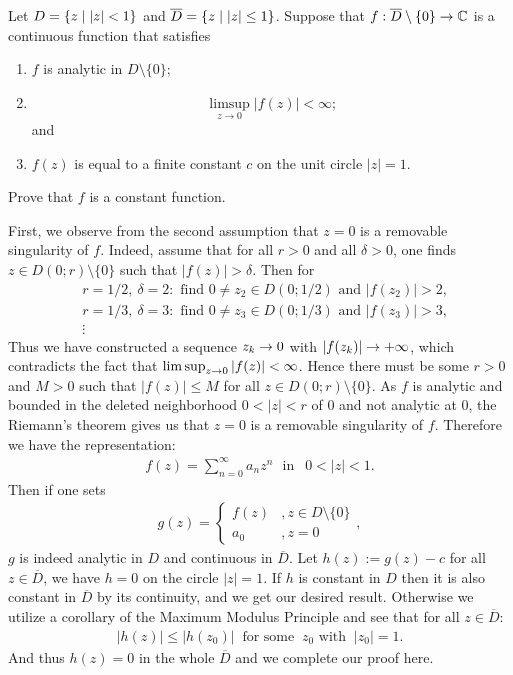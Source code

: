 \begin{problem}
Let $D = \left\{ z \mid |z| < 1\right\}$ and $\overline{D} = \left\{ z \mid |z| \leq 1\right\}$. Suppose that $f: \overline{D} \setminus \{0\} \to \mathbb{C}$ is a continuous function that satisfies
\begin{enumerate}
    \item $f$ is analytic in $D \setminus \{0\}$;
    \item $$ \limsup_{z \to 0} |f(z)| < \infty; $$ and
    \item $f(z)$ is equal to a finite constant $c$ on the unit circle $|z| = 1$.
\end{enumerate}
Prove that $f$ is a constant function.
\begin{solution}
First, we observe from the second assumption that $z=0$ is a removable singularity of $f$. Indeed, assume that for all $r>0$ and all $\delta >0$, one finds $z \in D(0;r)\setminus \{0\}$ such that $|f(z)|> \delta$. Then for \begin{align*}
    &r=1/2,\ \delta =2: \text{ find } 0\neq z_2 \in D(0;1/2) \text{ and } |f(z_2)|>2, \\
    &r=1/3,\ \delta =3: \text{ find } 0\neq z_3 \in D(0;1/3) \text{ and } |f(z_3)|>3, \\
    &\vdots
\end{align*}
Thus we have constructed a sequence $z_k \rightarrow 0$ with $|f(z_k)| \rightarrow +\infty$, which contradicts the fact that $\limsup_{z\rightarrow 0} |f(z)| < \infty$. Hence there must be some $r>0$ and $M>0$ such that $|f(z)| \le M$ for all $z\in D(0;r)\setminus \{0\}$. As $f$ is analytic and bounded in the deleted neighborhood $0<|z|<r$ of $0$ and not analytic at $0$, the Riemann's theorem gives us that $z=0$ is a removable singularity of $f$. Therefore we have the representation:
\begin{align*}
    f(z) = \sum_{n=0}^{\infty} a_n z^n\ \ \ \text{in }\ \  0<|z|<1.
\end{align*}
Then if one sets 
\begin{align*}
    g(z) = \begin{cases}
    f(z) &, z\in D\setminus \{0\}\\
    a_0 &, z=0
    \end{cases},
\end{align*}
$g$ is indeed analytic in $D$ and continuous in $\overline{D}$. Let $h(z):= g(z) - c$ for all $z\in \overline{D}$, we have $h=0$ on the circle $|z|=1$. If $h$ is constant in $D$ then it is also constant in $\overline{D}$ by its continuity, and we get our desired result. Otherwise we utilize a corollary of the Maximum Modulus Principle and see that for all $z\in \overline{D}$:
\begin{align*}
    |h(z)| \le |h(z_0)| \ \text{ for some }\ z_0 \text{ with } \ |z_0|=1. 
\end{align*}
And thus $h(z)=0$ in the whole $\overline{D}$ and we complete our proof here.
\end{solution}
\end{problem}

